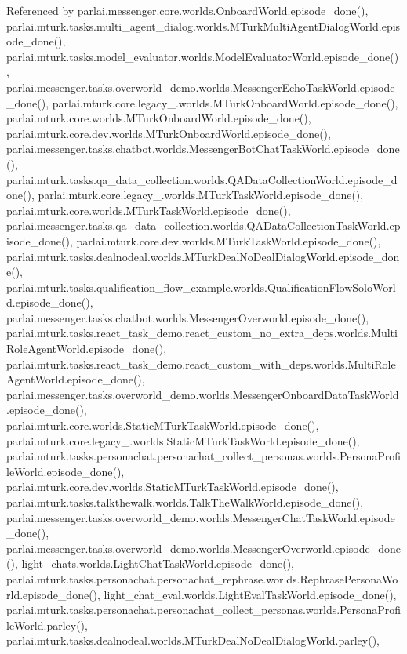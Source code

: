 Referenced by parlai.\+messenger.\+core.\+worlds.\+Onboard\+World.\+episode\+\_\+done(), parlai.\+mturk.\+tasks.\+multi\+\_\+agent\+\_\+dialog.\+worlds.\+M\+Turk\+Multi\+Agent\+Dialog\+World.\+episode\+\_\+done(), parlai.\+mturk.\+tasks.\+model\+\_\+evaluator.\+worlds.\+Model\+Evaluator\+World.\+episode\+\_\+done(), parlai.\+messenger.\+tasks.\+overworld\+\_\+demo.\+worlds.\+Messenger\+Echo\+Task\+World.\+episode\+\_\+done(), parlai.\+mturk.\+core.\+legacy\+\_.\+worlds.\+M\+Turk\+Onboard\+World.\+episode\+\_\+done(), parlai.\+mturk.\+core.\+worlds.\+M\+Turk\+Onboard\+World.\+episode\+\_\+done(), parlai.\+mturk.\+core.\+dev.\+worlds.\+M\+Turk\+Onboard\+World.\+episode\+\_\+done(), parlai.\+messenger.\+tasks.\+chatbot.\+worlds.\+Messenger\+Bot\+Chat\+Task\+World.\+episode\+\_\+done(), parlai.\+mturk.\+tasks.\+qa\+\_\+data\+\_\+collection.\+worlds.\+Q\+A\+Data\+Collection\+World.\+episode\+\_\+done(), parlai.\+mturk.\+core.\+legacy\+\_.\+worlds.\+M\+Turk\+Task\+World.\+episode\+\_\+done(), parlai.\+mturk.\+core.\+worlds.\+M\+Turk\+Task\+World.\+episode\+\_\+done(), parlai.\+messenger.\+tasks.\+qa\+\_\+data\+\_\+collection.\+worlds.\+Q\+A\+Data\+Collection\+Task\+World.\+episode\+\_\+done(), parlai.\+mturk.\+core.\+dev.\+worlds.\+M\+Turk\+Task\+World.\+episode\+\_\+done(), parlai.\+mturk.\+tasks.\+dealnodeal.\+worlds.\+M\+Turk\+Deal\+No\+Deal\+Dialog\+World.\+episode\+\_\+done(), parlai.\+mturk.\+tasks.\+qualification\+\_\+flow\+\_\+example.\+worlds.\+Qualification\+Flow\+Solo\+World.\+episode\+\_\+done(), parlai.\+messenger.\+tasks.\+chatbot.\+worlds.\+Messenger\+Overworld.\+episode\+\_\+done(), parlai.\+mturk.\+tasks.\+react\+\_\+task\+\_\+demo.\+react\+\_\+custom\+\_\+no\+\_\+extra\+\_\+deps.\+worlds.\+Multi\+Role\+Agent\+World.\+episode\+\_\+done(), parlai.\+mturk.\+tasks.\+react\+\_\+task\+\_\+demo.\+react\+\_\+custom\+\_\+with\+\_\+deps.\+worlds.\+Multi\+Role\+Agent\+World.\+episode\+\_\+done(), parlai.\+messenger.\+tasks.\+overworld\+\_\+demo.\+worlds.\+Messenger\+Onboard\+Data\+Task\+World.\+episode\+\_\+done(), parlai.\+mturk.\+core.\+worlds.\+Static\+M\+Turk\+Task\+World.\+episode\+\_\+done(), parlai.\+mturk.\+core.\+legacy\+\_.\+worlds.\+Static\+M\+Turk\+Task\+World.\+episode\+\_\+done(), parlai.\+mturk.\+tasks.\+personachat.\+personachat\+\_\+collect\+\_\+personas.\+worlds.\+Persona\+Profile\+World.\+episode\+\_\+done(), parlai.\+mturk.\+core.\+dev.\+worlds.\+Static\+M\+Turk\+Task\+World.\+episode\+\_\+done(), parlai.\+mturk.\+tasks.\+talkthewalk.\+worlds.\+Talk\+The\+Walk\+World.\+episode\+\_\+done(), parlai.\+messenger.\+tasks.\+overworld\+\_\+demo.\+worlds.\+Messenger\+Chat\+Task\+World.\+episode\+\_\+done(), parlai.\+messenger.\+tasks.\+overworld\+\_\+demo.\+worlds.\+Messenger\+Overworld.\+episode\+\_\+done(), light\+\_\+chats.\+worlds.\+Light\+Chat\+Task\+World.\+episode\+\_\+done(), parlai.\+mturk.\+tasks.\+personachat.\+personachat\+\_\+rephrase.\+worlds.\+Rephrase\+Persona\+World.\+episode\+\_\+done(), light\+\_\+chat\+\_\+eval.\+worlds.\+Light\+Eval\+Task\+World.\+episode\+\_\+done(), parlai.\+mturk.\+tasks.\+personachat.\+personachat\+\_\+collect\+\_\+personas.\+worlds.\+Persona\+Profile\+World.\+parley(), parlai.\+mturk.\+tasks.\+dealnodeal.\+worlds.\+M\+Turk\+Deal\+No\+Deal\+Dialog\+World.\+parley(), 